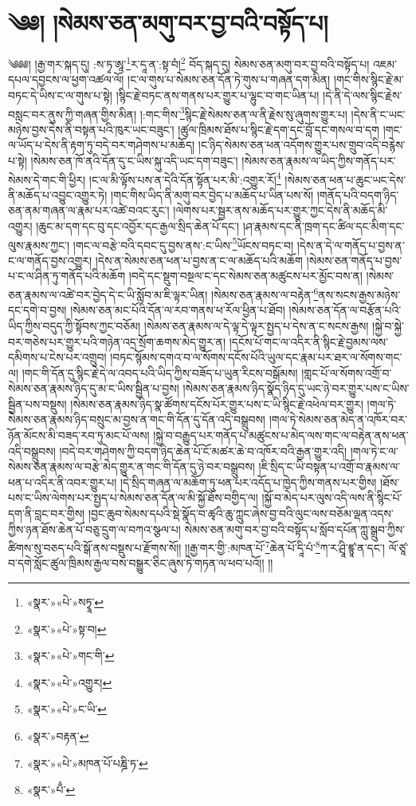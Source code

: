 \chapter{༄༅། །སེམས་ཅན་མགུ་བར་བྱ་བའི་བསྟོད་པ།}༄༅༅། །རྒྱ་གར་སྐད་དུ། :ས་ཏྭ་ཨཱ་\footnote{«སྣར་»«པེ་»སཏྭཱ་}ར་དཱ་ན་:སྟ་བཾ།\footnote{«སྣར་»«པེ་»སྟ་བ།} བོད་སྐད་དུ། སེམས་ཅན་མགུ་བར་བྱ་བའི་བསྟོད་པ། འཇམ་དཔལ་དབྱངས་ལ་ཕྱག་འཚལ་ལོ། །ང་ལ་གུས་པ་སེམས་ཅན་དོན་ཏེ་གུས་པ་གཞན་དག་མིན། །གང་གིས་སྙིང་རྗེ་མ་བཏང་དེ་ཡིས་ང་ལ་གུས་པ་སྟེ། །སྙིང་རྗེ་བཏང་ནས་གནས་པར་གྱུར་པ་ལྷུང་བ་གང་ཡིན་པ། །དེ་ནི་དེ་ལས་སྙིང་རྗེས་བསླང་བར་ནུས་ཀྱི་གཞན་གྱིས་མིན། །:གང་གིས་\footnote{«སྣར་»«པེ་»གང་གི་}སྙིང་རྗེ་སེམས་ཅན་ལ་ནི་རྗེས་སུ་ཞུགས་གྱུར་པ། །དེས་ནི་ང་ཡང་མཉེས་བྱས་དེས་ནི་བསྟན་པའི་ཁུར་ཡང་བཟུང་། །ཚུལ་ཁྲིམས་ཐོས་པ་སྙིང་རྗེ་དག་དང་བློ་དང་གསལ་བ་དག །གང་ལ་ཡོད་པ་དེས་ནི་རྟག་ཏུ་བདེ་བར་གཤེགས་པ་མཆོད། །ང་ཉིད་སེམས་ཅན་ཕན་འདོགས་གྱུར་པས་གྲུབ་འདི་བརྙེས་པ་སྟེ། །སེམས་ཅན་ཁོ་ནའི་དོན་དུ་ང་ཡིས་སྐུ་འདི་ཡང་དག་བཟུང་། །སེམས་ཅན་རྣམས་ལ་ཡིད་ཀྱིས་གནོད་པར་སེམས་དེ་གང་གི་ཕྱིར། །ང་ལ་མི་ལྟོས་པས་ན་དེའི་དོན་སྟོན་པར་མི་:འགྱུར་རོ།\footnote{«སྣར་»«པེ་»འགྱུར།} །སེམས་ཅན་ཕན་པ་ཆུང་ཡང་དེས་ནི་མཆོད་པ་འབྱུང་འགྱུར་ཏེ། །གང་གིས་ཡིད་ནི་མགུ་བར་བྱེད་པ་མཆོད་པ་ཡིན་པས་སོ། །གནོད་པའི་བདག་ཉིད་ཅན་ནམ་གཞན་ལ་རྣམ་པར་འཚེ་བའང་རུང་། །ལེགས་པར་སྦྱར་ནས་མཆོད་པར་གྱུར་ཀྱང་དེས་ནི་མཆོད་མི་འགྱུར། །ཆུང་མ་དག་དང་བུ་དང་འབྱོར་དང་རྒྱལ་སྲིད་ཆེན་པོ་དང་། །ཤ་རྣམས་དང་ནི་ཁྲག་དང་ཚིལ་དང་མིག་དང་ལུས་རྣམས་ཀྱང་། །གང་ལ་བརྩེ་བའི་དབང་དུ་བྱས་ནས་:ང་ཡིས་\footnote{«སྣར་»«པེ་»ང་ཡི་}ཡོངས་བཏང་བ། །དེས་ན་དེ་ལ་གནོད་པ་བྱས་ན་ང་ལ་གནོད་བྱས་འགྱུར། །དེས་ན་སེམས་ཅན་ཕན་པ་བྱས་ན་ང་ལ་མཆོད་པའི་མཆོག །སེམས་ཅན་གནོད་པ་བྱས་པ་ང་ལ་ཤིན་ཏུ་གནོད་པའི་མཆོག །བདེ་དང་སྡུག་བསྔལ་ང་དང་སེམས་ཅན་མཚུངས་པར་མྱོང་བས་ན། །སེམས་ཅན་རྣམས་ལ་འཚེ་བར་བྱེད་དེ་ང་ཡི་སློབ་མ་ཇི་ལྟར་ཡིན། །སེམས་ཅན་རྣམས་ལ་བརྟེན་\footnote{«སྣར་»བརྟན་}ནས་སངས་རྒྱས་མཉེས་དང་དགེ་བ་བྱས། །སེམས་ཅན་མང་པོའི་དོན་ལ་རབ་གནས་ཕ་རོལ་ཕྱིན་པ་ཐོབ། །སེམས་ཅན་དོན་ལ་བརྩོན་པའི་ཡིད་ཀྱིས་བདུད་ཀྱི་སྟོབས་ཀྱང་བཅོམ། །སེམས་ཅན་རྣམས་ལ་དེ་ལྟ་དེ་ལྟར་སྤྱད་པ་དེས་ན་ང་སངས་རྒྱས། །སྐྱེ་བ་སྐྱེ་བར་གཅེས་པར་གྱུར་པའི་གཉེན་འདྲ་སྲོག་ཆགས་མེད་གྱུར་ན། །དངོས་པོ་གང་ལ་འདིར་ནི་སྙིང་རྗེ་བྱམས་ལས་དམིགས་པ་ངེས་པར་འགྲུབ། །བཏང་སྙོམས་དགའ་བ་ལ་སོགས་དངོས་པོའི་ཡུལ་དང་རྣམ་པར་ཐར་ལ་སོགས་གང་ལ། །གང་གི་དོན་དུ་སྙིང་རྗེ་དེ་ལ་འབད་པའི་ཡིད་ཀྱིས་བཟོད་པ་ཡུན་རིངས་བསྒོམས། །གླང་པོ་ལ་སོགས་འགྲོ་བ་སེམས་ཅན་རྣམས་ཉིད་དུ་མ་ང་ཡིས་སྦྱིན་པ་བྱས། །སེམས་ཅན་རྣམས་ཉིད་སྣོད་ཉིད་དུ་ཡང་ཉེ་བར་གྱུར་པས་ང་ཡིས་སྦྱིན་པས་བསྡུས། །སེམས་ཅན་རྣམས་ཉིད་སྣ་ཚོགས་དངོས་པོར་གྱུར་པས་ང་ཡི་སྙིང་རྗེ་འཕེལ་བར་གྱུར། །གལ་ཏེ་སེམས་ཅན་རྣམས་ཉིད་བསྲུང་མ་བྱས་ན་གང་གི་དོན་དུ་དོན་འདི་བསྒྲུབས། །གལ་ཏེ་སེམས་ཅན་མེད་ན་འཁོར་བར་ཉོན་མོངས་མི་བཟད་རབ་ཏུ་མང་པོ་ལས། །སྐྱེ་བ་བརྒྱུད་པར་གནོད་པ་མཚུངས་པ་མེད་ལས་གང་ལ་བརྟེན་ནས་ཕན་འདི་བསྒྲུབས། །བདེ་བར་གཤེགས་ཀྱི་བདག་ཉིད་ཆེན་པོ་ངོ་མཚར་ཆེ་བ་འཁོར་བའི་རྒྱན་གྱུར་འདི། །གལ་ཏེ་ང་ལ་སེམས་ཅན་རྣམས་ལ་བརྩེ་མེད་གྱུར་ན་གང་གི་དོན་དུ་ཉེ་བར་བསྒྲུབས། །ཇི་སྲིད་ང་ཡི་བསྟན་པ་འགྲོ་བ་རྣམས་ལ་ཕན་པ་འདིར་ནི་འབར་གྱུར་པ། །དེ་སྲིད་གཞན་ལ་མཆོག་ཏུ་ཕན་པར་འདོད་པ་ཁྱེད་ཀྱིས་གནས་པར་གྱིས། །ཐོས་པས་ང་ཡིས་ལེགས་པར་སྤྱད་པ་སེམས་ཅན་དོན་ལ་མི་སྐྱོ་ཐོས་བགྱིད་ལ། །སྐྱོ་བ་མེད་པར་ལུས་འདི་ལས་ནི་སྙིང་པོ་དག་ནི་བླང་བར་གྱིས། །བྱང་ཆུབ་སེམས་དཔའི་སྡེ་སྣོད་བ་ཚྭའི་ཆུ་ཀླུང་ཞེས་བྱ་བའི་ལུང་ལས་བཅོམ་ལྡན་འདས་ཀྱིས་ཉན་ཐོས་ཆེན་པོ་བཅུ་དྲུག་ལ་བཀའ་སྩལ་པ། སེམས་ཅན་མགུ་བར་བྱ་བའི་བསྟོད་པ་སློབ་དཔོན་ཀླུ་སྒྲུབ་ཀྱིས་ཚིགས་སུ་བཅད་པའི་སྒོ་ནས་བསྡུས་པ་རྫོགས་སོ།། །།རྒྱ་གར་གྱི་:མཁན་པོ་\footnote{«སྣར་»«པེ་»མཁན་པོ་པཎྜི་ཏ་}ཆེན་པོ་དཱི་པཾ་\footnote{«སྣར་»པྃ་}ཀ་ར་ཤྲཱི་ཛྙཱ་ན་དང་། ལོ་ཙཱ་བ་དགེ་སློང་ཚུལ་ཁྲིམས་རྒྱལ་བས་བསྒྱུར་ཅིང་ཞུས་ཏེ་གཏན་ལ་ཕབ་པའོ།། །།